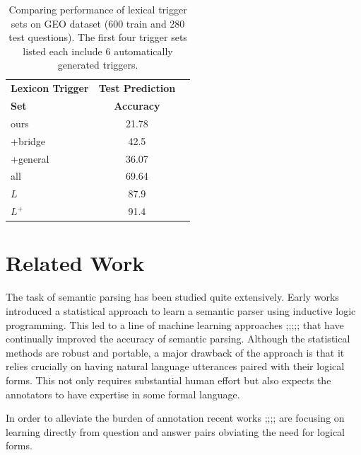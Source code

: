 \documentclass[11pt]{article}
\begin{document}
\begin{center}
\begin{table}[!h]
\centering
\begin{tabular}{|l|c|c|}
\hline
{\textbf{Lexicon Trigger}} & {\textbf{Test Prediction}} \\ %
\textbf{Set} &  \textbf{Accuracy} \\
\hline
ours      & {{21.78}} \\ \hline
+bridge   & {{42.5}} \\ \hline
+general  & {{36.07}} \\ \hline
all       & {{69.64}} \\ \hline
$L$       & {{87.9}} \\ \hline
$L^+$     & {{91.4}} \\ \hline
\end{tabular}
\caption{Comparing performance of lexical trigger sets on GEO dataset (600 train
and 280 test questions). The first four trigger sets listed each include 6
automatically generated triggers.} \label{tab:normal}
\end{table}
\end{center}

\section{Related Work}
The task of semantic parsing has been studied quite extensively. Early works \cite{ZM96} introduced a statistical approach to learn a semantic parser using inductive logic programming. This led to a line of machine learning approaches \cite{TM01};\cite{GeM05};\cite{KWM05};\cite{ZC07};\cite{WM06};\cite{KZGS10} that have continually improved the accuracy of semantic parsing.
Although the statistical methods are robust and portable, a major drawback of the approach is that it relies crucially on having natural language utterances paired with their logical forms. This not only requires substantial human effort but also expects the annotators to have expertise in some formal language.

In order to alleviate the burden of annotation recent works \cite{CGRR11};\cite{CGCR10};\cite{PD09};\cite{LJK11};\cite{AZ11} %
are focusing on learning directly from question and answer pairs obviating the need for logical forms.
\end{document}
